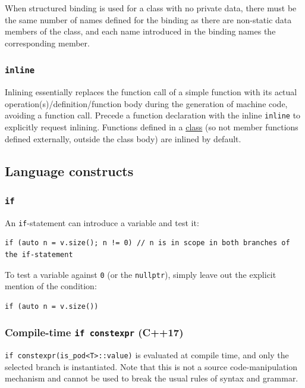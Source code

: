 \documentclass[table, xcdraw]{article}%
\begin{document}
When structured binding is used for a class with no private data, there must be the same number of names defined for the binding as there are non-static data members of the class, and each name introduced in the binding names the corresponding member.

\subsubsection{\texttt{inline}}
Inlining essentially replaces the function call of a simple function with its actual operation(s)/definition/function body during the generation of machine code, avoiding a function call. Precede a function declaration with the inline \texttt{inline} to explicitly request inlining. Functions defined in a \hyperref[class]{class} (so not member functions defined externally, outside the class body) are inlined by default.

\subsection{Language constructs}

\subsubsection{\texttt{if}}
An \texttt{if}-statement can introduce a variable and test it:

\begin{verbatim}
if (auto n = v.size(); n != 0) // n is in scope in both branches of the if-statement
\end{verbatim}

To test a variable against \texttt{0} (or the \texttt{nullptr}), simply leave out the explicit mention of the condition:

\begin{verbatim}
if (auto n = v.size())
\end{verbatim}

\subsubsection{Compile-time \texttt{if constexpr} (C++17)}

\texttt{if constexpr(is_pod<T>::value)} is evaluated at compile time, and only the selected branch is instantiated. Note that this is not a source code-manipulation mechanism and cannot be used to break the usual rules of syntax and grammar.
\end{document}
